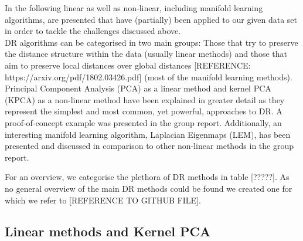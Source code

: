 \documentclass[journal, a4paper]{IEEEtran}
\begin{document}
In the following linear as well as non-linear, including manifold learning algorithms, are presented that have (partially) been applied to our given data set in order to tackle the challenges discussed above.\\

DR algorithms can be categorised in two main groups: Those that try to preserve the distance structure within the data (usually linear methods) and those that aim to preserve local distances over global distances [REFERENCE: https://arxiv.org/pdf/1802.03426.pdf] (most of the manifold learning methods).\\


Principal Component Analysis (PCA) as a linear method and kernel PCA (KPCA) as a non-linear method have been explained in greater detail as they represent the simplest and most common, yet powerful, approaches to DR. A proof-of-concept example was presented in the group report.
Additionally, an interesting manifold learning algorithm, Laplacian Eigenmaps (LEM), has been presented and discussed in comparison to other non-linear methods in the group report.

For an overview, we categorise the plethora of DR methods in table [?????]. As no general overview of the main DR methods could be found we created one for which we refer to [REFERENCE TO GITHUB FILE].






\subsection{Linear methods and Kernel PCA}
\end{document}
